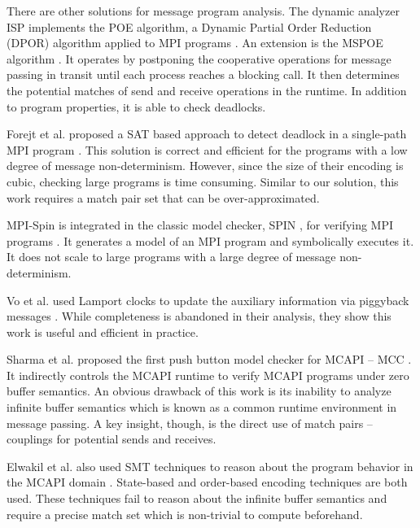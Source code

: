 There are other solutions for message program analysis.
The dynamic analyzer ISP implements the POE algorithm, a Dynamic Partial Order Reduction (DPOR) algorithm \cite{DBLP:conf/popl/FlanaganG05} applied to MPI programs \cite{DBLP:conf/ppopp/VakkalankaSGK08}. An extension is the MSPOE algorithm \cite{DBLP:conf/sbmf/SharmaGB12}. It operates by postponing the cooperative operations for message passing in transit until each process reaches a blocking call. It then determines the potential matches of send and receive operations in the runtime. In addition to program properties, it is able to check deadlocks.

Forejt et al. proposed a SAT based approach to detect deadlock in a single-path MPI program \cite{DBLP:conf/fm/ForejtKNS14}. This solution is correct and efficient for the programs with a low degree of message non-determinism. However, since the size of their encoding is cubic, checking large programs is time consuming. Similar to our solution, this work requires a match pair set that can be over-approximated.

 

MPI-Spin is integrated in the classic model checker, SPIN \cite{DBLP:journals/tse/Holzmann97}, for verifying MPI programs \cite{DBLP:conf/vmcai/Siegel07,DBLP:conf/pvm/Siegel07}. It generates a model of an MPI program and symbolically executes it. It does not scale to large programs with a large degree of message non-determinism.

Vo et al. used Lamport clocks to update the auxiliary information via piggyback messages \cite{DBLP:conf/sc/VoAGSSB10,DBLP:conf/IEEEpact/VoGKSSB11}. While completeness is abandoned in their analysis, they show this work is useful and efficient in practice. 

Sharma et al. proposed the first push button model checker for MCAPI -- MCC \cite{DBLP:conf/fmcad/SharmaGMH09}. It indirectly controls the MCAPI runtime to verify MCAPI programs under zero buffer semantics. An obvious drawback of this work is its inability to analyze infinite buffer semantics which is known as a common runtime environment in message passing. A key insight, though, is the direct use of match pairs -- couplings for potential sends and receives.

Elwakil et al. also used SMT techniques to reason about the program behavior in the MCAPI domain \cite{DBLP:conf/issta/ElwakilY10,DBLP:conf/atva/ElwakilYW10}. State-based and order-based encoding techniques are both used. These techniques fail to reason about the infinite buffer semantics and require a precise match set which is non-trivial to compute beforehand.

